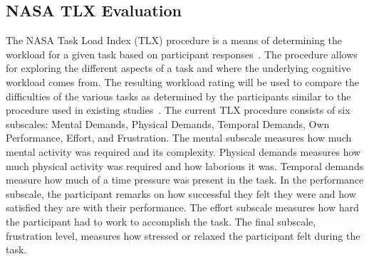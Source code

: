 \documentclass[11pt]{article}
\begin{document}
\subsection{NASA TLX Evaluation}
The NASA Task Load Index (TLX) procedure is a means of determining the workload for a given task based on participant responses~\cite{NASA}. The procedure allows for exploring the different aspects of a task and where the underlying cognitive workload comes from. The resulting workload rating will be used to compare the difficulties of the various tasks as determined by the participants similar to the procedure used in existing studies~\cite{Ke}. The current TLX procedure consists of six subscales: Mental Demands, Physical Demands, Temporal Demands, Own Performance, Effort, and Frustration. The mental subscale measures how much mental activity was required and its complexity. Physical demands measures how much physical activity was required and how laborious it was. Temporal demands measure how much of a time pressure was present in the task. In the performance subscale, the participant remarks on how successful they felt they were and how satisfied they are with their performance. The effort subscale measures how hard the participant had to work to accomplish the task. The final subscale, frustration level, measures how stressed or relaxed the participant felt during the task.
\end{document}
